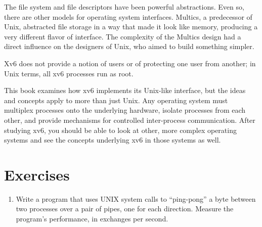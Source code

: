 The file system and file descriptors have been  powerful
abstractions.
Even so, there are other models for operating system interfaces.
Multics, a predecessor of Unix,
abstracted file storage in a way that made it look like memory,
producing a very different flavor of interface.
The complexity of the Multics design had a direct influence
on the designers of Unix, who aimed to build something simpler.

Xv6 does not provide a notion of users or of protecting
one user from another; in Unix terms, all xv6 processes
run as root.

This book examines how xv6 implements its Unix-like interface,
but the ideas and concepts apply to more than just Unix.
Any operating system must multiplex processes onto
the underlying hardware, isolate processes from each
other, and provide mechanisms for controlled
inter-process communication.
After studying xv6, you should be able to
look at other, more complex operating systems
and see the concepts underlying xv6 in those systems as well.

\section{Exercises}

\begin{enumerate}

\item Write a program that uses UNIX system calls to
``ping-pong'' a byte between two processes over a pair
of pipes, one for each direction. Measure the
program's performance, in exchanges per second.

\end{enumerate}
